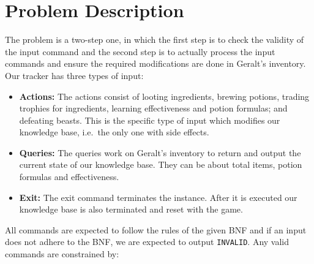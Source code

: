 \documentclass[a4paper,12pt]{article}
\begin{document}
\section{Problem Description}
The problem is a two-step one, in which the first step is to check the validity of the input command and the second step is to actually process the input commands and ensure the required modifications are done in Geralt’s inventory. Our tracker has three types of input:
\begin{itemize}
    \item \textbf{Actions:} The actions consist of looting ingredients, brewing potions, trading trophies for ingredients, learning effectiveness and potion formulas; and defeating beasts. This is the specific type of input which modifies our knowledge base, i.e.\ the only one with side effects.
    \item \textbf{Queries:} The queries work on Geralt’s inventory to return and output the current state of our knowledge base. They can be about total items, potion formulas and effectiveness.
    \item \textbf{Exit:} The exit command terminates the instance. After it is executed our knowledge base is also terminated and reset with the game.
\end{itemize}
All commands are expected to follow the rules of the given BNF and if an input does not adhere to the BNF, we are expected to output \verb|INVALID|. Any valid commands are constrained by:
\end{document}
